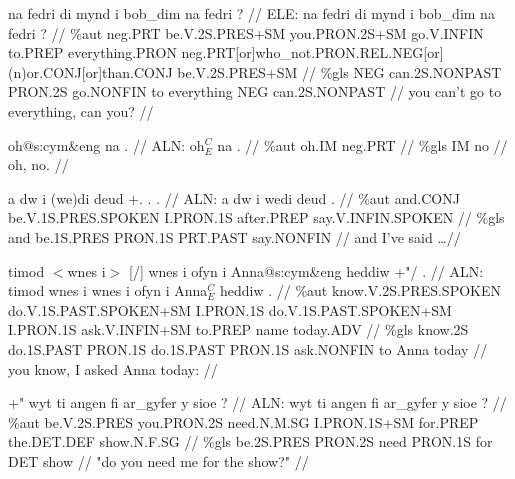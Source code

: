 \documentclass[a4paper,10pt]{article}
\begin{document}
\ex
\begingl[lingstyle=gergl]
\glchat na fedri di mynd i bob\_dim na fedri ? //
\glsurface ELE:  na fedri di mynd i bob\_dim na fedri ?  //
\glauto \%aut  neg{\scriptsize .PRT} be{\scriptsize .V.2S.PRES+SM} you{\scriptsize .PRON.2S+SM} go{\scriptsize .V.INFIN} to{\scriptsize .PREP} everything{\scriptsize .PRON} neg{\scriptsize .PRT[or]who\_not.PRON.REL.NEG[or](n)or.CONJ[or]than.CONJ} be{\scriptsize .V.2S.PRES+SM}   //
\glmanual \%gls  NEG can{\scriptsize .2S.NONPAST} PRON{\scriptsize .2S} go{\scriptsize .NONFIN} to everything NEG can{\scriptsize .2S.NONPAST}   //
\gleng you can't go to everything, can you? //
\endgl
\xe

\ex
\begingl[lingstyle=gergl]
\glchat oh@s:cym\&eng na . //
\glsurface ALN:  oh$^{C}_{E}$ na .  //
\glauto \%aut  oh{\scriptsize .IM} neg{\scriptsize .PRT}   //
\glmanual \%gls  IM no   //
\gleng oh, no. //
\endgl
\xe

\ex
\begingl[lingstyle=gergl]
\glchat a dw i (we)di deud +. . . //
\glsurface ALN:  a dw i wedi deud .  //
\glauto \%aut  and{\scriptsize .CONJ} be{\scriptsize .V.1S.PRES.SPOKEN} I{\scriptsize .PRON.1S} after{\scriptsize .PREP} say{\scriptsize .V.INFIN.SPOKEN}   //
\glmanual \%gls  and be{\scriptsize .1S.PRES} PRON{\scriptsize .1S} PRT{\scriptsize .PAST} say{\scriptsize .NONFIN}   //
\gleng and I've said \dots  //
\endgl
\xe

\ex
\begingl[lingstyle=gergl]
\glchat timod $<$wnes i$>$ [/] wnes i ofyn i Anna@s:cym\&eng heddiw +"/ . //
\glsurface ALN:  timod wnes i wnes i ofyn i Anna$^{C}_{E}$ heddiw .  //
\glauto \%aut  know{\scriptsize .V.2S.PRES.SPOKEN} do{\scriptsize .V.1S.PAST.SPOKEN+SM} I{\scriptsize .PRON.1S} do{\scriptsize .V.1S.PAST.SPOKEN+SM} I{\scriptsize .PRON.1S} ask{\scriptsize .V.INFIN+SM} to{\scriptsize .PREP} name today{\scriptsize .ADV}   //
\glmanual \%gls  know{\scriptsize .2S} do{\scriptsize .1S.PAST} PRON{\scriptsize .1S} do{\scriptsize .1S.PAST} PRON{\scriptsize .1S} ask{\scriptsize .NONFIN} to Anna today   //
\gleng you know, I asked Anna today: //
\endgl
\xe

\ex
\begingl[lingstyle=gergl]
\glchat +" wyt ti angen fi ar\_gyfer y sioe ? //
\glsurface ALN:  wyt ti angen fi ar\_gyfer y sioe ?  //
\glauto \%aut  be{\scriptsize .V.2S.PRES} you{\scriptsize .PRON.2S} need{\scriptsize .N.M.SG} I{\scriptsize .PRON.1S+SM} for{\scriptsize .PREP} the{\scriptsize .DET.DEF} show{\scriptsize .N.F.SG}   //
\glmanual \%gls  be{\scriptsize .2S.PRES} PRON{\scriptsize .2S} need PRON{\scriptsize .1S} for DET show   //
\gleng "do you need me for the show?" //
\endgl
\xe
\end{document}

